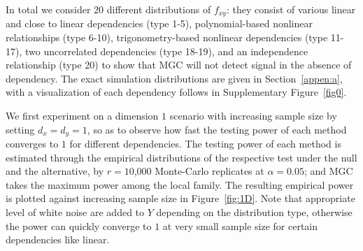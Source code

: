 \documentclass[11pt]{article}
\begin{document}

In total we consider $20$ different distributions of $f_{xy}$: they consist of various linear and close to linear dependencies (type 1-5), polynomial-based nonlinear relationships (type 6-10), trigonometry-based nonlinear dependencies (type 11-17), two uncorrelated dependencies (type 18-19), and an independence relationship (type 20) to show that MGC will not detect signal in the absence of dependency. The exact simulation distributions are given in Section~\ref{appen:a}, with a visualization of each dependency follows in Supplementary Figure~\ref{fig0}.

We first experiment on a dimension $1$ scenario with increasing sample size by setting $d_{x}=d_{y}=1$, so as to observe how fast the testing power of each method converges to $1$ for different dependencies. The testing power of each method is estimated through the empirical distributions of the respective test under the null and the alternative, by $r=10$,$000$ Monte-Carlo replicates at $\alpha=0.05$; and MGC takes the maximum power among the local family. The resulting empirical power is plotted against increasing sample size in Figure~\ref{fig:1D}. Note that appropriate level of white noise are added to $Y$ depending on the distribution type, otherwise the power can quickly converge to $1$ at very small sample size for certain dependencies like linear.
\end{document}
